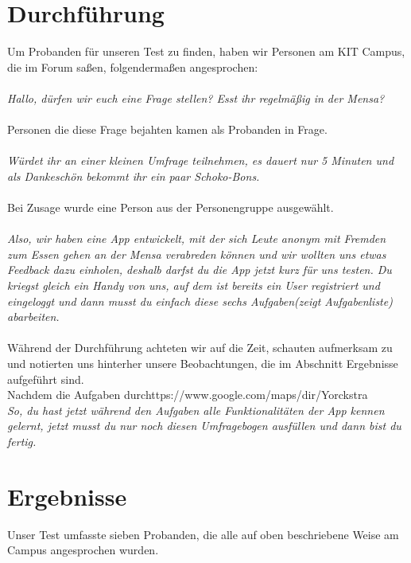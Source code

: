 \documentclass[a4paper]{scrreprt}
\begin{document}
\section{Durchführung}
Um Probanden für unseren Test zu finden, haben wir Personen am KIT Campus, die im Forum saßen, folgendermaßen angesprochen: \\
\ \\
\textit{Hallo, dürfen wir euch eine Frage stellen? Esst ihr regelmäßig in der Mensa?} \\ 
\ \\
Personen die diese Frage bejahten kamen als Probanden in Frage. \\
\ \\
\textit{Würdet ihr an einer kleinen Umfrage teilnehmen, es dauert nur 5 Minuten und als Dankeschön bekommt ihr ein paar Schoko-Bons.}  \\ 
\ \\
Bei Zusage wurde eine Person aus der Personengruppe ausgewählt.\\
\ \\
\textit{Also, wir haben eine App entwickelt, mit der sich Leute anonym mit Fremden zum Essen gehen an der Mensa verabreden können und wir wollten uns etwas Feedback dazu einholen, deshalb darfst du die App jetzt kurz für uns testen. Du kriegst gleich ein Handy von uns, auf dem ist bereits ein User registriert und eingeloggt und dann musst du einfach diese sechs Aufgaben(zeigt Aufgabenliste) abarbeiten.} \\
\ \\
Während der Durchführung achteten wir auf die Zeit, schauten aufmerksam zu und notierten uns hinterher unsere Beobachtungen, die im Abschnitt Ergebnisse aufgeführt sind. \\
Nachdem die Aufgaben durchttps://www.google.com/maps/dir/Yorckstra%
\ \\
\textit{So, du hast jetzt während den Aufgaben alle Funktionalitäten der App kennen gelernt, jetzt musst du nur noch diesen Umfragebogen ausfüllen und dann bist du fertig.}

\newpage
\section{Ergebnisse}
Unser Test umfasste sieben Probanden, die alle auf oben beschriebene Weise am Campus angesprochen wurden.
\end{document}
